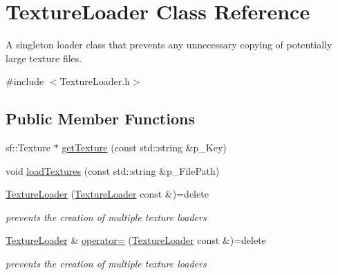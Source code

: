 \hypertarget{class_texture_loader}{}\section{Texture\+Loader Class Reference}
\label{class_texture_loader}


A singleton loader class that prevents any unnecessary copying of potentially large texture files.  




{\ttfamily \#include $<$Texture\+Loader.\+h$>$}

\subsection*{Public Member Functions}
\begin{DoxyCompactItemize}
\item 
sf\+::\+Texture $\ast$ \hyperlink{class_texture_loader_ad0e763368d9e1ce26b25819113685b28}{get\+Texture} (const std\+::string \&p\+\_\+\+Key)
\item 
void \hyperlink{class_texture_loader_a7e9ef47fb129ac6accf99ec1548c3f6a}{load\+Textures} (const std\+::string \&p\+\_\+\+File\+Path)
\item 
\mbox{\label{class_texture_loader_a8e89f35e81bf1cfdd739d91ec0f00831}} 
\hyperlink{class_texture_loader_a8e89f35e81bf1cfdd739d91ec0f00831}{Texture\+Loader} (\hyperlink{class_texture_loader}{Texture\+Loader} const \&)=delete
\begin{DoxyCompactList}\small\item\em prevents the creation of multiple texture loaders \end{DoxyCompactList}\item 
\mbox{\label{class_texture_loader_a137de3f6a2f013406d5dcf76d7d4b901}} 
\hyperlink{class_texture_loader}{Texture\+Loader} \& \hyperlink{class_texture_loader_a137de3f6a2f013406d5dcf76d7d4b901}{operator=} (\hyperlink{class_texture_loader}{Texture\+Loader} const \&)=delete
\begin{DoxyCompactList}\small\item\em prevents the creation of multiple texture loaders \end{DoxyCompactList}\end{DoxyCompactItemize}

